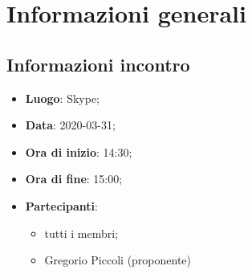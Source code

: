 \section{Informazioni generali}
\subsection{Informazioni incontro}
\begin{itemize}
\item \textbf{Luogo}: Skype;
\item \textbf{Data}: 2020-03-31;
\item \textbf{Ora di inizio}: 14:30;
\item \textbf{Ora di fine}: 15:00;
\item \textbf{Partecipanti}:
	\begin{itemize}
		\item tutti i membri;
		\item Gregorio Piccoli (proponente)
	\end{itemize}
\end{itemize}

